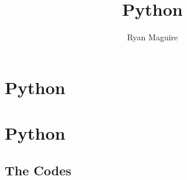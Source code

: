 \documentclass[crop=false,class=book,oneside]{standalone}
\begin{document}
    \ifx\ifplanetdiff\undefined
        \newif\iffunct
        \title{Python}
        \author{Ryan Maguire}
        \date{\vspace{-5ex}}
        \maketitle
        \tableofcontents
        \clearpage
        \chapter*{Python}
        \setcounter{chapter}{5}
    \else
        \chapter{Python}
    \fi
    \section{The Codes}
\end{document}
